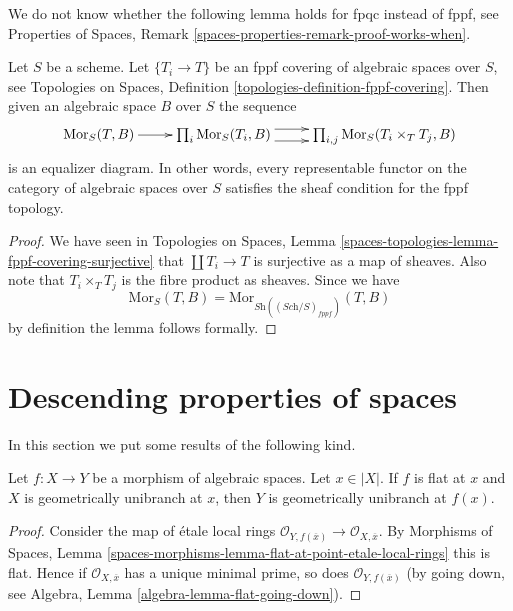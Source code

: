 \noindent
We do not know whether the following lemma holds for fpqc instead of
fppf, see
Properties of Spaces, Remark \ref{spaces-properties-remark-proof-works-when}.

\begin{lemma}
\label{lemma-fppf-universal-effective-epimorphisms}
Let $S$ be a scheme.
Let $\{T_i \to T\}$ be an fppf covering of algebraic
spaces over $S$, see
Topologies on Spaces, Definition \ref{topologies-definition-fppf-covering}.
Then given an algebraic space $B$ over $S$ the sequence
$$
\xymatrix{
\text{Mor}_S(T, B) \ar[r] &
\prod\nolimits_i \text{Mor}_S(T_i, B) \ar@<1ex>[r] \ar@<-1ex>[r] &
\prod\nolimits_{i, j} \text{Mor}_S(T_i \times_T T_j, B)
}
$$
is an equalizer diagram.
In other words, every representable functor on the category of
algebraic spaces over $S$ satisfies the sheaf condition for the fppf topology.
\end{lemma}

\begin{proof}
We have seen in
Topologies on Spaces,
Lemma \ref{spaces-topologies-lemma-fppf-covering-surjective}
that $\coprod T_i \to T$ is surjective as a map of sheaves.
Also note that $T_i \times_T T_j$ is the fibre product as sheaves.
Since we have
$$
\text{Mor}_S(T, B) = \text{Mor}_{\textit{Sh}((\textit{Sch}/S)_{fppf})}(T, B)
$$
by definition the lemma follows formally.
\end{proof}










\section{Descending properties of spaces}
\label{section-descending-properties-spaces}

\noindent
In this section we put some results of the following kind.

\begin{lemma}
\label{lemma-descend-unibranch}
Let $f : X \to Y$ be a morphism of algebraic spaces. Let $x \in |X|$. If $f$
is flat at $x$ and $X$ is geometrically unibranch at $x$, then $Y$ is
geometrically unibranch at $f(x)$.
\end{lemma}

\begin{proof}
Consider the map of \'etale local rings
$\mathcal{O}_{Y, f(\overline{x})} \to \mathcal{O}_{X, \overline{x}}$.
By
Morphisms of Spaces, Lemma
\ref{spaces-morphisms-lemma-flat-at-point-etale-local-rings}
this is flat. Hence if $\mathcal{O}_{X, \overline{x}}$ has a unique minimal
prime, so does $\mathcal{O}_{Y, f(\overline{x})}$ (by going down, see
Algebra, Lemma \ref{algebra-lemma-flat-going-down}).
\end{proof}






